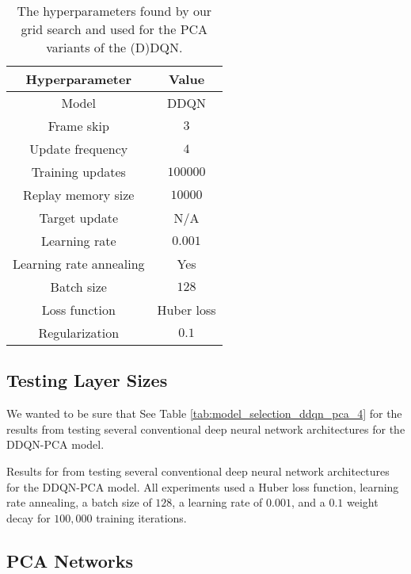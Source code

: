 \documentclass[11pt]{article}
\begin{document}
\begin{table}[!htbp]
    \centering
    \begin{tabular}{c|c}
        \toprule
        Hyperparameter & Value \\ \midrule
        Model & DDQN \\
        Frame skip & $3$ \\
        Update frequency & $4$ \\
        Training updates & $100000$ \\
        Replay memory size & $10000$ \\
        Target update & N/A \\
        Learning rate & $0.001$ \\
        Learning rate annealing & Yes \\
        Batch size & $128$ \\
        Loss function & Huber loss \\
        Regularization & $0.1$ \\
        \bottomrule
    \end{tabular}
    \caption{The hyperparameters found by our grid search and used for the PCA variants of the (D)DQN.}
    \label{tab:grid_search_hyperparameters}
\end{table}

\subsection{Testing Layer Sizes}

We wanted to be sure that See Table \ref{tab:model_selection_ddqn_pca_4} for the results from testing several conventional deep neural network architectures for the DDQN-PCA model.

\begin{table}[!htbp]
  \footnotesize
  \centering
  
  
  \caption{Results for from testing several conventional deep neural network architectures for the DDQN-PCA model. All experiments used a Huber loss function, learning rate annealing, a batch size of $128$, a learning rate of $0.001$, and a $0.1$ weight decay for $100,000$ training iterations.}
  \label{tab:model_selection_ddqn_pca_4}
\end{table}

\subsection{PCA Networks}
\end{document}
